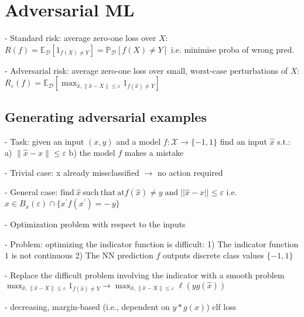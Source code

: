 \section{Adversarial ML}



- Standard risk: average zero-one loss over $X$: $R(f)=\mathbb{E}_{\mathcal{D}}\left[1_{f(X)\neq Y}\right]=\mathbb{P}_{\mathcal{D}}\left[f(X)\neq Y\right]$ i.e. minimise proba of wrong pred.


- Adversarial risk: average zero-one loss over small, worst-case perturbations of $X$: $R_{\varepsilon}(f)={{{\mathbb{E}}}}_{\mathcal{D}}\left[\operatorname*{max}_{\hat{x},\|\hat{x}-X\|\leq\varepsilon}1_{f(\hat{x})\neq Y}\right]$

\subsection*{Generating adversarial examples}

- Task: given an input $(x, y)$ and a model $f : \mathcal{X}\rightarrow \{-1,1\}$ find an input $\hat{x}$ s.t.: 
a) $\|{\hat{x}}-x\|\leq\varepsilon$ b) the model $f$ makes a mistake

- Trivial case: x already missclassified $\rightarrow$ no action required

- General case: ${\mathrm{find~}}{\hat{x}}~\mathrm{such~that}{\mathrm{~at}}f({\hat{x}})\neq y\operatorname{and}{\big\vert\vert}{\hat{x}}-x\vert\vert\leq\varepsilon$ i.e. $\hat{x}\in B_{x}(\varepsilon)\cap\{x^{\prime}f(x^{\prime})=-\,y\}$

- Optimization problem with respect to the inputs

- Problem: optimizing the indicator function is difficult: 1) The indicator function $1$ is not continuous 2) The NN prediction $f$ outputs discrete class values $\{-1,1\}$

- Replace the difficult problem involving the indicator with a smooth problem $\operatorname*{max}_{\hat{x},\|\hat{x}-X\|\leq\varepsilon}1_{f(\hat{x})\neq Y} \rightarrow \operatorname*{max}_{\hat{x},\|\hat{x}-X\|\leq\varepsilon}\ell(yg(\hat{x}))$

- decreasing, margin-based (i.e., dependent on $y * g(x)$) clf loss

